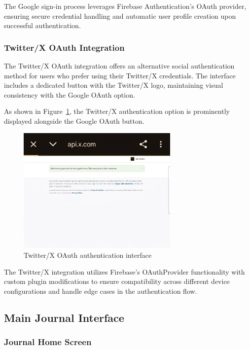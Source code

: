 The Google sign-in process leverages Firebase Authentication's OAuth provider, ensuring secure credential handling and automatic user profile creation upon successful authentication.

\subsubsection{Twitter/X OAuth Integration}

The Twitter/X OAuth integration offers an alternative social authentication method for users who prefer using their Twitter/X credentials. The interface includes a dedicated button with the Twitter/X logo, maintaining visual consistency with the Google OAuth option.

As shown in Figure~\ref{fig:twitter-oauth}, the Twitter/X authentication option is prominently displayed alongside the Google OAuth button.

 \begin{figure}[H]
 \centering
 \includegraphics[width=0.7\textwidth]{files/imgs/prototype/x_oauth.jpeg}
 \caption{Twitter/X OAuth authentication interface}
 \label{fig:twitter-oauth}
 \end{figure}

The Twitter/X integration utilizes Firebase's OAuthProvider functionality with custom plugin modifications to ensure compatibility across different device configurations and handle edge cases in the authentication flow.

\subsection{Main Journal Interface}

\subsubsection{Journal Home Screen}

